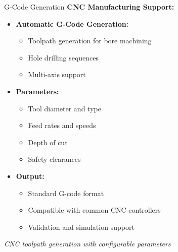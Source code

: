 \documentclass[aspectratio=169,10pt]{beamer}
\begin{document}
\begin{frame}{G-Code Generation}
\textbf{CNC Manufacturing Support:}

\begin{itemize}
    \item \textbf{Automatic G-Code Generation:}
    \begin{itemize}
        \item Toolpath generation for bore machining
        \item Hole drilling sequences
        \item Multi-axis support
    \end{itemize}
    
    \item \textbf{Parameters:}
    \begin{itemize}
        \item Tool diameter and type
        \item Feed rates and speeds
        \item Depth of cut
        \item Safety clearances
    \end{itemize}
    
    \item \textbf{Output:}
    \begin{itemize}
        \item Standard G-code format
        \item Compatible with common CNC controllers
        \item Validation and simulation support
    \end{itemize}
\end{itemize}

\vspace{0.3cm}
\textit{CNC toolpath generation with configurable parameters}
\end{frame}
\end{document}
